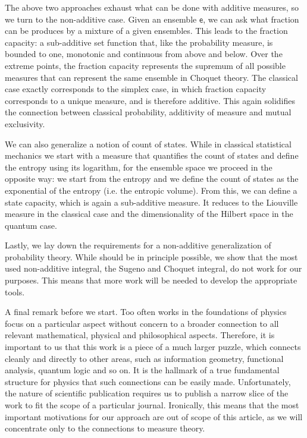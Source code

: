 \documentclass[10pt,twocolumn, nofootinbib]{revtex4-2}
\newcommand{\ens}[1][e] {\mathsf{#1}} %
\begin{document}
The above two approaches exhaust what can be done with additive measures, so we turn to the non-additive case. Given an ensemble $\ens$, we can ask what fraction can be produces by a mixture of a given ensembles. This leads to the fraction capacity: a sub-additive set function that, like the probability measure, is bounded to one, monotonic and continuous from above and below. Over the extreme points, the fraction capacity represents the supremum of all possible measures that can represent the same ensemble in Choquet theory. The classical case exactly corresponds to the simplex case, in which fraction capacity corresponds to a unique measure, and is therefore additive. This again solidifies the connection between classical probability, additivity of measure and mutual exclusivity.

We can also generalize a notion of count of states. While in classical statistical mechanics we start with a measure that quantifies the count of states and define the entropy using its logarithm, for the ensemble space we proceed in the opposite way: we start from the entropy and we define the count of states as the exponential of the entropy (i.e. the entropic volume). From this, we can define a state capacity, which is again a sub-additive measure. It reduces to the Liouville measure in the classical case and the dimensionality of the Hilbert space in the quantum case.

Lastly, we lay down the requirements for a non-additive generalization of probability theory. While should be in principle possible, we show that the most used non-additive integral, the Sugeno and Choquet integral, do not work for our purposes. This means that more work will be needed to develop the appropriate tools.

A final remark before we start. Too often works in the foundations of physics focus on a particular aspect without concern to a broader connection to all relevant mathematical, physical and philosophical aspects. Therefore, it is important to us that this work is a piece of a much larger puzzle, which connects cleanly and directly to  other areas, such as information geometry, functional analysis, quantum logic and so on. It is the hallmark of a true fundamental structure for physics that such connections can be easily made. Unfortunately, the nature of scientific publication requires us to publish a narrow slice of the work to fit the scope of a particular journal. Ironically, this means that the most important motivations for our approach are out of scope of this article, as we will concentrate only to the connections to measure theory.
\end{document}
